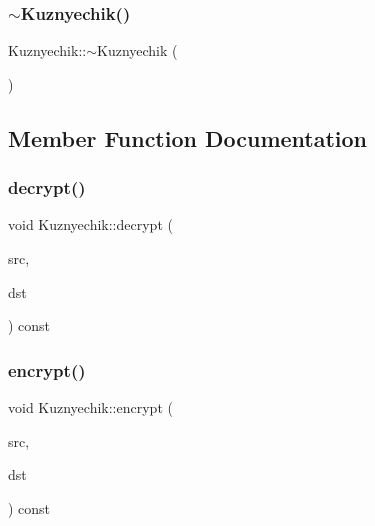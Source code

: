 \mbox{\label{class_kuznyechik_a0dab125f7a2ba66559ee611256985c45}} 
\subsubsection{\texorpdfstring{$\sim$\+Kuznyechik()}{~Kuznyechik()}}
{\footnotesize\ttfamily Kuznyechik\+::$\sim$\+Kuznyechik (\begin{DoxyParamCaption}{ }\end{DoxyParamCaption})}



\subsection{Member Function Documentation}
\mbox{\label{class_kuznyechik_a8f699d0a38e8fa9c147d7b31d759bf26}} 
\subsubsection{\texorpdfstring{decrypt()}{decrypt()}}
{\footnotesize\ttfamily void Kuznyechik\+::decrypt (\begin{DoxyParamCaption}\item[{const \hyperlink{class_byte_block}{Byte\+Block} \&}]{src,  }\item[{\hyperlink{class_byte_block}{Byte\+Block} \&}]{dst }\end{DoxyParamCaption}) const}

\mbox{\label{class_kuznyechik_ace290770ef015f19d6c0e06c66a4f29d}} 
\subsubsection{\texorpdfstring{encrypt()}{encrypt()}}
{\footnotesize\ttfamily void Kuznyechik\+::encrypt (\begin{DoxyParamCaption}\item[{const \hyperlink{class_byte_block}{Byte\+Block} \&}]{src,  }\item[{\hyperlink{class_byte_block}{Byte\+Block} \&}]{dst }\end{DoxyParamCaption}) const}



